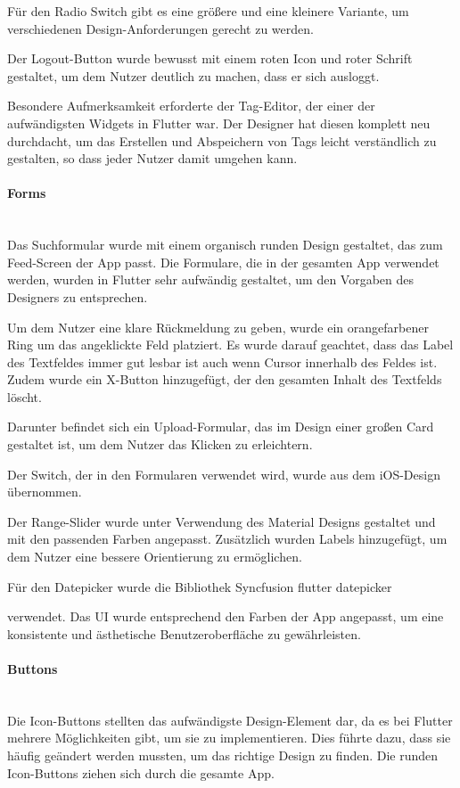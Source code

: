 Für den Radio Switch gibt es eine größere und eine kleinere Variante, um verschiedenen Design-Anforderungen gerecht zu werden.

Der Logout-Button wurde bewusst mit einem roten Icon und roter Schrift gestaltet, um dem Nutzer deutlich zu machen, dass er sich ausloggt.

Besondere Aufmerksamkeit erforderte der Tag-Editor, der einer der aufwändigsten Widgets in Flutter war. Der Designer hat diesen komplett neu durchdacht, um das Erstellen und Abspeichern von Tags leicht verständlich zu gestalten, so dass jeder Nutzer damit umgehen kann.

\paragraph{Forms}\mbox{} \\
Das Suchformular wurde mit einem organisch runden Design gestaltet, das zum Feed-Screen der App passt. Die Formulare, die in der gesamten App verwendet werden, wurden in Flutter sehr aufwändig gestaltet, um den Vorgaben des Designers zu entsprechen.

Um dem Nutzer eine klare Rückmeldung zu geben, wurde ein
orangefarbener Ring um das angeklickte Feld platziert. Es
wurde darauf geachtet, dass das Label des Textfeldes immer
gut lesbar ist auch wenn Cursor innerhalb des Feldes
ist. Zudem wurde ein X-Button hinzugefügt, der den gesamten
Inhalt des Textfelds löscht.

Darunter befindet sich ein Upload-Formular, das im Design einer großen Card gestaltet ist, um dem Nutzer das Klicken zu erleichtern.

Der Switch, der in den Formularen verwendet wird, wurde aus dem iOS-Design übernommen.

Der Range-Slider wurde unter Verwendung des Material Designs gestaltet und mit den passenden Farben angepasst. Zusätzlich wurden Labels hinzugefügt, um dem Nutzer eine bessere Orientierung zu ermöglichen.

Für den Datepicker wurde die Bibliothek
Syncfusion flutter datepicker

\cite{syncfusion_flutter_datepicker} verwendet. Das UI wurde
entsprechend den Farben der App angepasst, um eine
konsistente und ästhetische Benutzeroberfläche zu
gewährleisten.

\paragraph{Buttons}\mbox{} \\
Die Icon-Buttons stellten das aufwändigste Design-Element
dar, da es bei Flutter mehrere Möglichkeiten gibt, um sie zu
implementieren. Dies führte dazu, dass sie häufig geändert
werden mussten, um das richtige Design zu finden. Die
runden Icon-Buttons ziehen sich durch die gesamte App.


